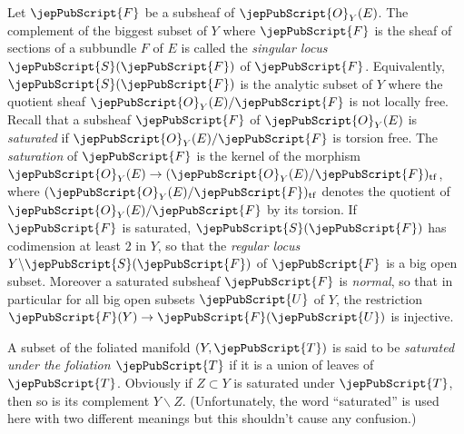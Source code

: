 Let $\jepPubScript{F}$ be a subsheaf of $\jepPubScript{O}_Y(E)$. The complement of the biggest subset of $Y$ where $\jepPubScript{F}$ is the sheaf of sections of a subbundle $F$ of $E$ is called the \emph{singular locus} $\jepPubScript{S}(\jepPubScript{F})$ of $\jepPubScript{F}$. Equivalently, $\jepPubScript{S}(\jepPubScript{F})$ is the analytic subset of $Y$ where the quotient sheaf $\jepPubScript{O}_Y(E)/\jepPubScript{F}$ is not locally free. Recall that a subsheaf $\jepPubScript{F}$ of $\jepPubScript{O}_Y(E)$ is \emph{saturated} if $\jepPubScript{O}_Y(E)/\jepPubScript{F}$ is torsion free. The \emph{saturation} of $\jepPubScript{F}$ is the kernel of the morphism $\jepPubScript{O}_Y(E)\to(\jepPubScript{O}_Y(E)/\jepPubScript{F})_{\mathrm{tf}}$, where $(\jepPubScript{O}_Y(E)/\jepPubScript{F})_{\mathrm{tf}}$ denotes the quotient of $\jepPubScript{O}_Y(E)/\jepPubScript{F}$ by its torsion. If $\jepPubScript{F}$ is saturated, $\jepPubScript{S}(\jepPubScript{F})$ has codimension at least $2$ in $Y$, so that the \emph{regular locus} $Y\backslash\jepPubScript{S}(\jepPubScript{F})$ of $\jepPubScript{F}$ is a big open subset. Moreover a saturated subsheaf $\jepPubScript{F}$ is \emph{normal}, so that in particular for all big open subsets $\jepPubScript{U}$ of $Y$, the restriction $\jepPubScript{F}(Y)\to\jepPubScript{F}(\jepPubScript{U})$ is injective.

A subset of the foliated manifold $(Y,\jepPubScript{T})$ is said to be \emph{saturated under the foliation $\jepPubScript{T}$} if it is a union of leaves of $\jepPubScript{T}$. Obviously if $Z\subset Y$ is saturated under $\jepPubScript{T}$, then so is its complement $Y\backslash Z$. (Unfortunately, the word ``saturated'' is used here with two different meanings but this shouldn't cause any confusion.)

